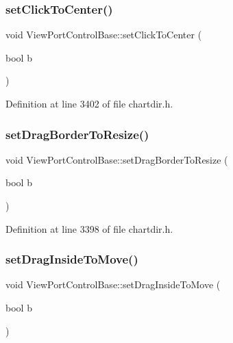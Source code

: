 \subsubsection{\texorpdfstring{set\+Click\+To\+Center()}{setClickToCenter()}}
{\footnotesize\ttfamily void View\+Port\+Control\+Base\+::set\+Click\+To\+Center (\begin{DoxyParamCaption}\item[{bool}]{b }\end{DoxyParamCaption})\hspace{0.3cm}{\ttfamily [inline]}}



Definition at line 3402 of file chartdir.\+h.

\mbox{\label{class_view_port_control_base_af492092d7a8e4c9ae02d8db6d0d56611}} 
\subsubsection{\texorpdfstring{set\+Drag\+Border\+To\+Resize()}{setDragBorderToResize()}}
{\footnotesize\ttfamily void View\+Port\+Control\+Base\+::set\+Drag\+Border\+To\+Resize (\begin{DoxyParamCaption}\item[{bool}]{b }\end{DoxyParamCaption})\hspace{0.3cm}{\ttfamily [inline]}}



Definition at line 3398 of file chartdir.\+h.

\mbox{\label{class_view_port_control_base_a2e7a90ee53e46b85903aaad61c84fc60}} 
\subsubsection{\texorpdfstring{set\+Drag\+Inside\+To\+Move()}{setDragInsideToMove()}}
{\footnotesize\ttfamily void View\+Port\+Control\+Base\+::set\+Drag\+Inside\+To\+Move (\begin{DoxyParamCaption}\item[{bool}]{b }\end{DoxyParamCaption})\hspace{0.3cm}{\ttfamily [inline]}}



